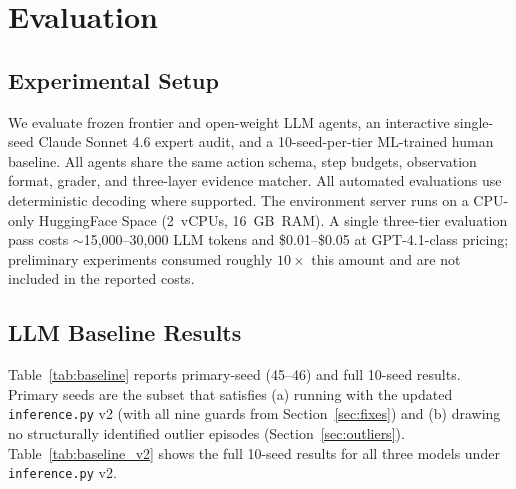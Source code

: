 \documentclass{article}
\begin{document}
\section{Evaluation}
\label{sec:eval}

\subsection{Experimental Setup}

We evaluate frozen frontier and open-weight LLM agents, an interactive
single-seed Claude Sonnet 4.6 expert audit, and a 10-seed-per-tier
ML-trained human baseline.  All agents share the same action schema,
step budgets, observation format, grader, and three-layer evidence
matcher.  All automated evaluations use deterministic decoding where
supported.  The environment server runs on a CPU-only HuggingFace Space
(2~vCPUs, 16~GB~RAM).  A single three-tier evaluation pass costs
$\sim$15{,}000--30{,}000 LLM tokens and \$0.01--\$0.05 at GPT-4.1-class
pricing; preliminary experiments consumed roughly $10\times$ this
amount and are not included in the reported costs.

\subsection{LLM Baseline Results}

Table~\ref{tab:baseline} reports primary-seed (45--46) and full 10-seed
results.  Primary seeds are the subset that satisfies (a) running with
the updated \texttt{inference.py} v2 (with all nine guards from
Section~\ref{sec:fixes}) and (b) drawing no structurally identified
outlier episodes (Section~\ref{sec:outliers}).
Table~\ref{tab:baseline_v2} shows the full 10-seed results for all
three models under \texttt{inference.py} v2.
\end{document}
